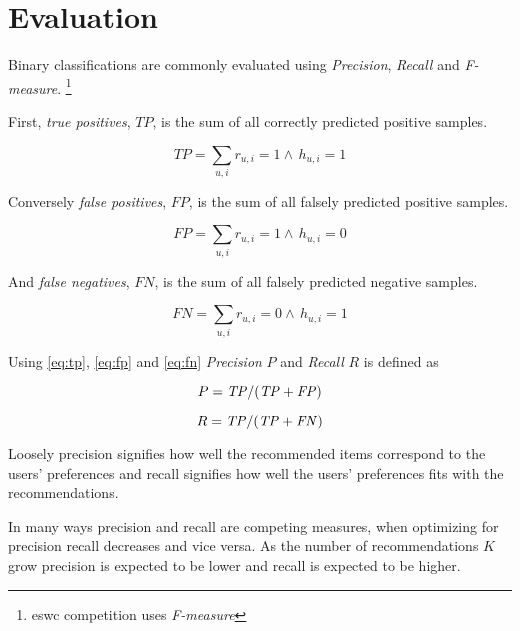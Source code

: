 
\newpage
\section{Evaluation}\label{sec:theory:eval}


Binary classifications are commonly evaluated using \textit{Precision}, \textit{Recall} and \textit{F-measure}.
\footnote{eswc competition uses \textit{F-measure}}

First, \textit{true positives}, $TP$, is the sum of all correctly predicted positive samples.

\begin{equation} \label{eq:tp}
    TP = \sum_{u, i} r_{u, i} = 1 \land \, h_{u, i} = 1
\end{equation}

Conversely \textit{false positives}, $FP$, is the sum of all falsely predicted positive samples.

\begin{equation} \label{eq:fp}
    FP = \sum_{u, i} r_{u, i} = 1 \land \, h_{u, i} = 0
\end{equation}

And \textit{false negatives}, $FN$, is the sum of all falsely predicted negative samples.

\begin{equation} \label{eq:fn}
    FN = \sum_{u, i} r_{u, i} = 0 \land \, h_{u, i} = 1
\end{equation}

Using \eqref{eq:tp}, \eqref{eq:fp} and \eqref{eq:fn} \textit{Precision} $P$ and \textit{Recall} $R$ is defined as

\begin{equation} \label{eq:precision}
    P = \mathit{TP} / (\mathit{TP} + \mathit{FP})
\end{equation}

\begin{equation} \label{eq:recall}
    R = \mathit{TP} / (\mathit{TP} + \mathit{FN})
\end{equation}

Loosely precision signifies how well the recommended items correspond to the users' preferences and recall signifies how well the users' preferences fits with the recommendations.  

In many ways precision and recall are competing measures, when optimizing for precision recall decreases and vice versa.  As the number of recommendations $K$ grow precision is expected to be lower and recall is expected to be higher. \citep{hu2008collaborative}


